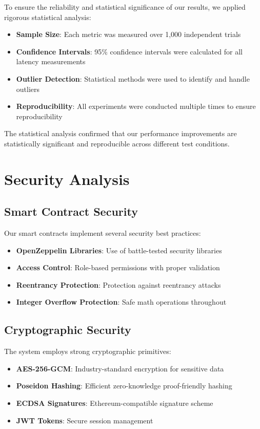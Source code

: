 \documentclass[conference]{IEEEtran}
\begin{document}
To ensure the reliability and statistical significance of our results, we applied rigorous statistical analysis:

\begin{itemize}
    \item \textbf{Sample Size}: Each metric was measured over 1,000 independent trials
    \item \textbf{Confidence Intervals}: 95\% confidence intervals were calculated for all latency measurements
    \item \textbf{Outlier Detection}: Statistical methods were used to identify and handle outliers
    \item \textbf{Reproducibility}: All experiments were conducted multiple times to ensure reproducibility
\end{itemize}

The statistical analysis confirmed that our performance improvements are statistically significant and reproducible across different test conditions.

\section{Security Analysis}

\subsection{Smart Contract Security}

Our smart contracts implement several security best practices:

\begin{itemize}
\item \textbf{OpenZeppelin Libraries}: Use of battle-tested security libraries
\item \textbf{Access Control}: Role-based permissions with proper validation
\item \textbf{Reentrancy Protection}: Protection against reentrancy attacks
\item \textbf{Integer Overflow Protection}: Safe math operations throughout
\end{itemize}

\subsection{Cryptographic Security}

The system employs strong cryptographic primitives:

\begin{itemize}
\item \textbf{AES-256-GCM}: Industry-standard encryption for sensitive data
\item \textbf{Poseidon Hashing}: Efficient zero-knowledge proof-friendly hashing
\item \textbf{ECDSA Signatures}: Ethereum-compatible signature scheme
\item \textbf{JWT Tokens}: Secure session management
\end{itemize}
\end{document}

